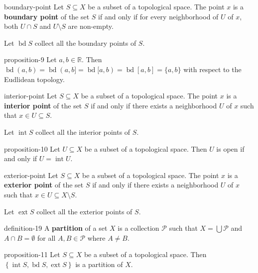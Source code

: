 \documentclass[10pt,]{article}
\newcommand{\terminology}[1]{\textbf{#1}}
\newcommand{\mb}{\mathbb}
\newcommand{\mc}{\mathcal}
\newcommand{\int}{\operatorname{int}}
\newcommand{\ext}{\operatorname{ext}}
\newcommand{\bd}{\operatorname{bd}}
\newcommand{\setList}[1]{\left\{#1\right\}}
\begin{document}
\begin{definition}{}{boundary-point}%
\hypertarget{p-52}{}%
Let \(S\subseteq X\) be a subset of a topological space. The point \(x\) is a \terminology{boundary point} of the set \(S\) if and only if for every neighborhood of \(U\) of \(x\), both \(U\cap S\) and \(U\setminus S\) are non-empty.%
\par
\hypertarget{p-53}{}%
Let \(\bd S\) collect all the boundary points of \(S\).%
\end{definition}
\begin{proposition}{}{}{proposition-9}%
\hypertarget{p-54}{}%
Let \(a,b\in\mb R\). Then \(\bd (a,b)=\bd (a,b]=\bd [a,b)=\bd [a,b]=\{a,b\}\) with respect to the Eudlidean topology.%
\end{proposition}
\begin{definition}{}{interior-point}%
\hypertarget{p-55}{}%
Let \(S\subseteq X\) be a subset of a topological space. The point \(x\) is a \terminology{interior point} of the set \(S\) if and only if there exists a neighborhood \(U\) of \(x\) such that \(x\in U\subseteq S\).%
\par
\hypertarget{p-56}{}%
Let \(\int S\) collect all the interior points of \(S\).%
\end{definition}
\begin{proposition}{}{}{proposition-10}%
\hypertarget{p-57}{}%
Let \(U\subseteq X\) be a subset of a topological space. Then \(U\) is open if and only if \(U=\int U\).%
\end{proposition}
\begin{definition}{}{exterior-point}%
\hypertarget{p-58}{}%
Let \(S\subseteq X\) be a subset of a topological space. The point \(x\) is a \terminology{exterior point} of the set \(S\) if and only if there exists a neighborhood \(U\) of \(x\) such that \(x\in U\subseteq X\setminus S\).%
\par
\hypertarget{p-59}{}%
Let \(\ext S\) collect all the exterior points of \(S\).%
\end{definition}
\begin{definition}{}{definition-19}%
\hypertarget{p-60}{}%
A \terminology{partition} of a set \(X\) is a collection \(\mc P\) such that \(X=\bigcup\mc P\) and \(A\cap B=\emptyset\) for all \(A,B\in\mc P\) where \(A\not=B\).%
\end{definition}
\begin{proposition}{}{}{proposition-11}%
\hypertarget{p-61}{}%
Let \(S\subseteq X\) be a subset of a topological space. Then \(\setList{\int S,\bd S,\ext S}\) is a partition of \(X\).%
\end{proposition}
\end{document}
